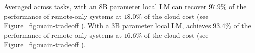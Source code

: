 


Averaged across tasks, \system with an 8B parameter local LM can recover $97.9\%$ of the performance of remote-only systems at $18.0\%$ of the cloud cost (see Figure~\ref{fig:main-tradeoff}). 
With a 3B parameter local LM, \system  achieves $93.4\%$ of the performance of remote-only systems at $16.6\%$ of the cloud cost (see Figure~\ref{fig:main-tradeoff}).





